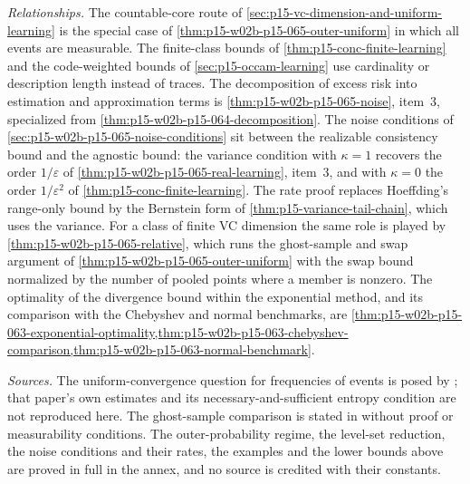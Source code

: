 \emph{Relationships.} The countable-core route of
\cref{sec:p15-vc-dimension-and-uniform-learning} is the special case of
\cref{thm:p15-w02b-p15-065-outer-uniform} in which all events are
measurable. The finite-class bounds of \cref{thm:p15-conc-finite-learning}
and the code-weighted bounds of \cref{sec:p15-occam-learning} use cardinality
or description length instead of traces. The decomposition of excess risk
into estimation and approximation terms is
\cref{thm:p15-w02b-p15-065-noise}, item~3, specialized from
\cref{thm:p15-w02b-p15-064-decomposition}. The noise conditions of
\cref{sec:p15-w02b-p15-065-noise-conditions} sit between the realizable
consistency bound and the agnostic bound: the variance condition with
\(\kappa=1\) recovers the order \(1/\varepsilon\) of
\cref{thm:p15-w02b-p15-065-real-learning}, item~3, and with \(\kappa=0\)
the order \(1/\varepsilon^2\) of \cref{thm:p15-conc-finite-learning}.
The rate proof replaces Hoeffding's range-only bound by the Bernstein form
of \cref{thm:p15-variance-tail-chain}, which uses the variance. For a
class of finite VC dimension the same role is played by
\cref{thm:p15-w02b-p15-065-relative}, which runs the ghost-sample and swap
argument of \cref{thm:p15-w02b-p15-065-outer-uniform} with the swap bound
normalized by the number of pooled points where a member is nonzero. The
optimality of the divergence bound within the exponential method, and its
comparison with the Chebyshev and normal benchmarks, are
\cref{thm:p15-w02b-p15-063-exponential-optimality,thm:p15-w02b-p15-063-chebyshev-comparison,thm:p15-w02b-p15-063-normal-benchmark}.

\emph{Sources.} The uniform-convergence question for frequencies of events
is posed by \cite{VapnikChervonenkis1971Uniform}; that paper's own
estimates and its necessary-and-sufficient entropy condition are not
reproduced here. The ghost-sample comparison is stated in
\cite[Section~5.2, Lemma~4, p.~17]{LuxburgScholkopf2008Author} without
proof or measurability conditions. The outer-probability regime, the
level-set reduction, the noise conditions and their rates, the examples and
the lower bounds above are proved in
full in the annex, and no source is credited with their constants.
